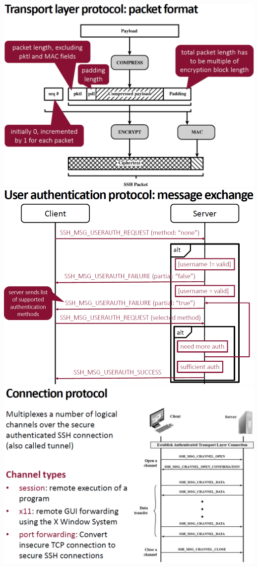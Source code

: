 \documentclass[12pt]{article}
\begin{document}
 \includegraphics[width=0.8\linewidth]{./slides/L7P4SSHPACK.png}\\
 \includegraphics[width=0.8\linewidth]{./slides/L7P4SSHAUTH.PNG}\\
 \includegraphics[width=0.8\linewidth]{./slides/L7P4SSHCON.PNG}\\
\end{document}
